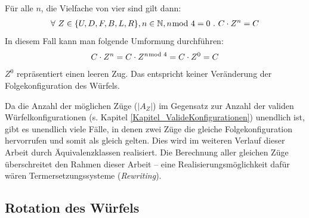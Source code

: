 \documentclass[12pt,a4paper, usenames, dvipsnames]{article}
\theoremstyle{mystyle}
\theoremstyle{definition}
\begin{document}
Für alle $n$, die Vielfache von vier sind gilt dann:
\begin{align*}
\forall \  Z \in \{U, D, F, B, L, R\}, n \in \mathbb{N}, n \hspace*{-0.6em} \mod 4 = 0 \ . \ 
C \cdot Z^n  
= C
\end{align*}
In diesem Fall kann man folgende Umformung durchführen:
\begin{align*}
C \cdot Z^n
= C \cdot Z^{n \hspace*{-0.5em} \mod 4} 
= C \cdot Z^0 
= C
\end{align*}
$Z^0$ repräsentiert einen leeren Zug. Das entspricht keiner Veränderung der Folgekonfiguration des Würfels.



Da die Anzahl der möglichen Züge ($|A_Z|$) im Gegensatz zur Anzahl der validen Würfel\-konfigurationen (s. Kapitel \ref{Kapitel_ValideKonfigurationen}) unendlich ist, gibt es unendlich viele Fälle, in denen zwei Züge die gleiche Folgekonfiguration hervorrufen und somit als gleich gelten. Dies wird im weiteren Verlauf dieser Arbeit durch Äquivalenzklassen realisiert. Die Berechnung aller gleichen Züge überschreitet den Rahmen dieser Arbeit -- eine Realisierungsmöglichkeit dafür wären Termersetzungssysteme (\textit{Rewriting}).


%
%
%
%
%
%
%
%
%
%

\subsection{Rotation des Würfels}

\label{Abschnitt_RotationDesWürfels}
\end{document}
